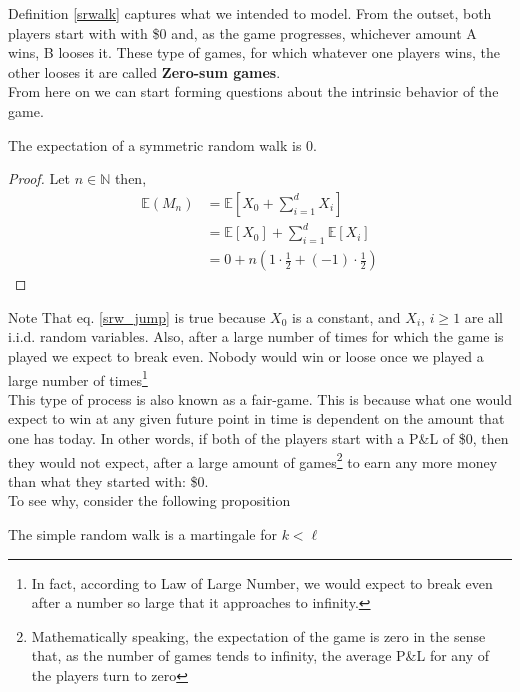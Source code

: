 \documentclass[../TGMAFFIRO]{subfiles}
\begin{document}
Definition \ref{srwalk} captures what we intended to model. From the outset, both players start with with \$0 and, as the game progresses, whichever amount A wins, B looses it. These type of games, for which whatever one players wins, the other looses it are called \textbf{Zero-sum games}.\\

From here on we can start forming questions about the intrinsic behavior of the game. 

\begin{proposition}\label{expectation_srw}
	The expectation of a symmetric random walk is 0.
\end{proposition}

\begin{proof}
	Let $n \in \mathbb{N}$ then,
	\begin{align}
	\mathbb{E}(M_n) &= \mathbb{E}\left[X_0 + \sum_{i=1}^d X_i\right] \nonumber \\
				    &= \mathbb{E}[X_0] + \sum_{i=1}^d \mathbb{E}\left[X_i\right] \label{srw_jump}\\
				    &= 0 + n  \left( 1 \cdot \frac{1}{2} + (-1) \cdot \frac{1}{2}\right) \nonumber
	\end{align}
\end{proof}

Note That eq. \ref{srw_jump} is true because $X_0$ is a constant, and $X_i$, $i \geq 1$ are all i.i.d. random variables. Also, after a large number of times for which the game is played we expect to break even. Nobody would win or loose once we played a large number of times\footnote{In fact, according to Law of Large Number, we would expect to break even after a number so large that it approaches to infinity.}\\

This type of process is also known as a fair-game. This is because what one would expect to win at any given future point in time is dependent on the amount that one has today. In other words, if both of the players start with a P\&L of \$0, then they would not expect, after a large amount of games\footnote{Mathematically speaking, the expectation of the game is zero in the sense that, as the number of games tends to infinity, the average P\&L for any of the players turn to zero} to earn any more money than what they started with: \$0.\\

To see why, consider the following proposition

\begin{proposition}
	The simple random walk is a martingale for $k < \ell$
\end{proposition}
\end{document}
